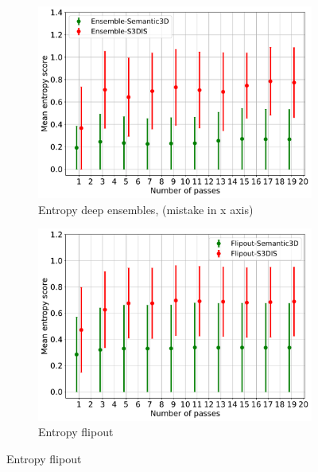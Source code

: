     \begin{figure}[!ht]
        \centering
        \begin{subfigure}{0.98\textwidth}
        \includegraphics[scale=0.6]{images/MSP/Ensembles_ENT_cnc.pdf}
        \caption{Entropy deep ensembles, (mistake in x axis)}
        \label{fig:ent_ensembles}
        \end{subfigure}
        \begin{subfigure}{0.98\textwidth}
        \includegraphics[scale=0.6]{images/MSP/Flipout_ENT_cnc.pdf}
        \caption{Entropy flipout}
        \label{fig:ent_flipout}
        \end{subfigure}
    \end{figure}
